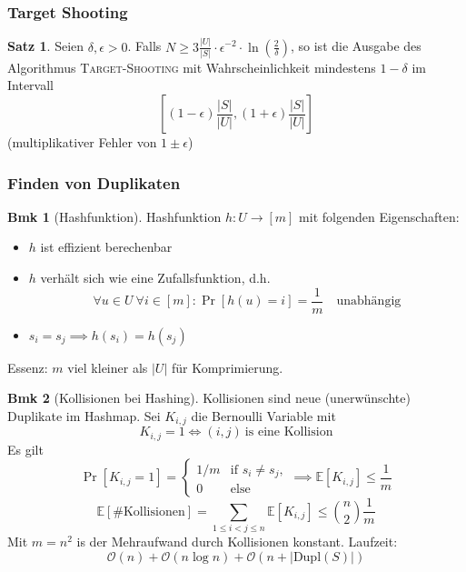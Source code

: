 \documentclass[a4paper, 10pt]{article}
\theoremstyle{definition}
\newtheorem{theorem}[definition]{Satz}
\newtheorem*{note}{Bmk}
\theoremstyle{named}
\newcommand{\BO}{\mathcal{O}}
\newcommand{\E}{\mathbb{E}}
\begin{document}
\subsubsection{Target Shooting}
\setcounter{definition}{78}
\begin{theorem}
    Seien $\delta, \epsilon > 0$. Falls $N \geq 3 \frac{|U|}{|S|} \cdot \epsilon^{-2} \cdot \ln(\frac{2}{\delta})$, so ist die Ausgabe des Algorithmus \textsc{Target-Shooting} mit Wahrscheinlichkeit mindestens $1 - \delta$ im Intervall $$\left[(1-\epsilon)\frac{|S|}{|U|}, (1 + \epsilon) \frac{|S|}{|U|}\right]$$
    (multiplikativer Fehler von $1 \pm \epsilon$)
\end{theorem}

\subsubsection{Finden von Duplikaten}
\begin{note}[Hashfunktion]
    Hashfunktion $h: U \to [m]$ mit folgenden Eigenschaften:
    \begin{itemize}
        \item $h$ ist effizient berechenbar
        \item $h$ verhält sich wie eine Zufallsfunktion, d.h.
        $$\forall u \in U \ \forall i \in [m] : \Pr[h(u) = i] = \frac{1}{m} \quad \text{unabhängig}$$
        \item $s_i = s_j \implies h(s_i) = h(s_j)$
    \end{itemize}
    Essenz: $m$ viel kleiner als $|U|$ für Komprimierung.
\end{note}

\begin{note}[Kollisionen bei Hashing]
    Kollisionen sind neue (unerwünschte) Duplikate im Hashmap. Sei $K_{i, j}$ die Bernoulli Variable mit 
    $$K_{i,j} = 1 \iff (i,j) \ \text{is eine Kollision}$$
    Es gilt $$\Pr[K_{i,j} = 1] = \begin{cases}
        1/m & \text{if $s_i \neq s_j$}, \\
        0 & \text{else}
    \end{cases}
    \implies \E[K_{i,j}] \leq \frac{1}{m}$$
    $$\E[\text{\#Kollisionen}] = \sum_{1 \leq i < j \leq n} \E[K_{i, j}] \leq \binom{n}{2}\frac{1}{m}$$
    Mit $m = n^2$ is der Mehraufwand durch Kollisionen konstant. Laufzeit:
    $$\BO(n) + \BO(n \log n) + \BO(n + |\text{Dupl}(S)|)$$
\end{note}
\end{document}
